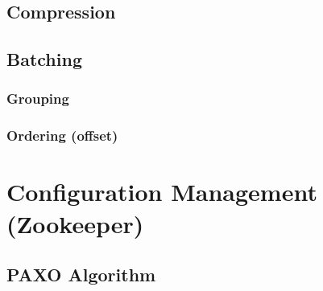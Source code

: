 \subsection{Compression}

\subsection{Batching}



\subsubsection{Grouping}

\subsubsection{Ordering (offset)}

\section{Configuration Management (Zookeeper)}
\subsection{PAXO Algorithm}
